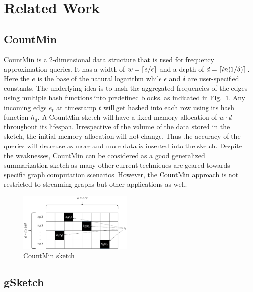 \section{Related Work}

\subsection{CountMin}

CountMin\cite{cormode_improved_2003} is a 2-dimensional data structure that is used for frequency approximation queries. It has a width of \(w = \lceil e / \epsilon\rceil\) and a depth of \(d = \lceil ln(1 / \delta)\rceil\). Here the \(e\) is the base of the natural logarithm while \(\epsilon\) and \(\delta\) are user-specified constants. The underlying idea is to hash the aggregated frequencies of the edges using multiple hash functions into predefined blocks, as indicated in Fig.~\ref{fig:countmin}. Any incoming edge \(e_t\) at timestamp \(t\) will get hashed into each row using its hash function \(h_d\). A CountMin sketch will have a fixed memory allocation of \(w \cdot d\) throughout its lifespan. Irrespective of the volume of the data stored in the sketch, the initial memory allocation will not change. Thus the accuracy of the queries will decrease as more and more data is inserted into the sketch. Despite the weaknesses, CountMin can be considered as a good generalized summarization sketch as many other current techniques are geared towards specific graph computation scenarios. However, the CountMin approach is not restricted to streaming graphs but other applications as well\cite{cormode_improved_2003}. 

\begin{figure}[htbp]
    \centerline{\includegraphics[width=0.5\textwidth]{img/countmin.png}}
    \caption{CountMin sketch\cite{zhao_gsketch:_2011}}
    \label{fig:countmin}
\end{figure}

\subsection{gSketch}

